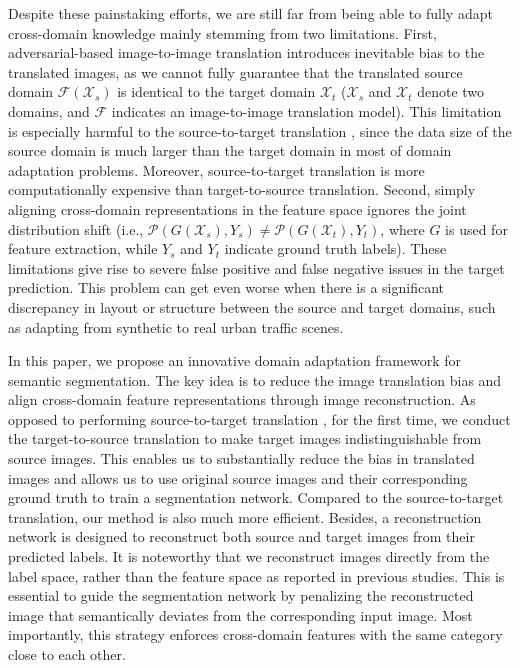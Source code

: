 \documentclass[runningheads]{llncs}
\begin{document}
	Despite these painstaking efforts, we are still far from being able to fully adapt cross-domain knowledge mainly stemming from two limitations. First, adversarial-based image-to-image translation introduces inevitable bias to the translated images, as we cannot fully guarantee that the translated source domain $ \mathcal{F}(\mathcal{X}_s) $ is identical to the target domain $ \mathcal{X}_t $ ($ \mathcal{X}_s $ and $ \mathcal{X}_t $ denote two domains, and $ \mathcal{F}$ indicates an image-to-image translation model). This limitation is especially harmful to the source-to-target translation \cite{zhang2018fully,hoffman2017cycada,wu2018dcan,murez2018image,li2019bidirectional}, since the data size of the source domain is much larger than the target domain in most of domain adaptation problems. Moreover, source-to-target translation is more computationally expensive than target-to-source translation. Second, simply aligning cross-domain representations in the feature space \cite{hoffman2016fcns,hoffman2017cycada,tsai2018learning} ignores the joint distribution shift (i.e., $ \mathcal{P}(G(\mathcal{X}_s), Y_s)  \neq \mathcal{P}(G(\mathcal{X}_t), Y_t) $, where $ G $ is used for feature extraction, while $ Y_s $ and $ Y_t $ indicate ground truth labels). These limitations give rise to severe false positive and false negative issues in the target prediction. This problem can get even worse when there is a significant discrepancy in layout or structure between the source and target domains, such as adapting from synthetic to real urban traffic scenes.
	
	In this paper, we propose an innovative domain adaptation framework for semantic segmentation. The key idea is to reduce the image translation bias and align cross-domain feature representations through image reconstruction. As opposed to performing source-to-target translation \cite{hoffman2017cycada,wu2018dcan,li2019bidirectional}, for the first time, we conduct the target-to-source translation to make target images indistinguishable from source images. This enables us to substantially reduce the bias in translated images and allows us to use original source images and their corresponding ground truth to train a segmentation network. Compared to the source-to-target translation, our method is also much more efficient. Besides, a reconstruction network is designed to reconstruct both source and target images from their predicted labels. It is noteworthy that we reconstruct images directly from the label space, rather than the feature space as reported in previous studies. This is essential to guide the segmentation network by penalizing the reconstructed image that semantically deviates from the corresponding input image. Most importantly, this strategy enforces cross-domain features with the same category close to each other.
	
\end{document}
